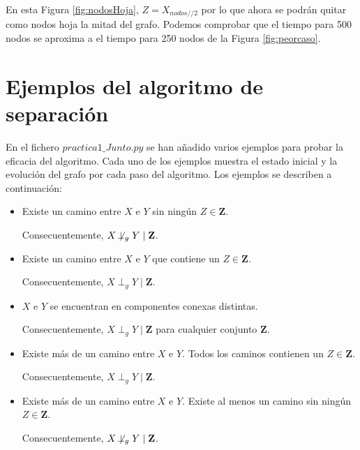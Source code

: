 \documentclass[a4paper,12pt]{article}
\newcommand{\notperpg}{\mathrel{\not\!\perp_g}}
\begin{document}
En esta Figura \ref{fig:nodosHoja}, $Z = X_{nodos//2}$ por lo que ahora se podrán quitar como nodos hoja la mitad del grafo. Podemos comprobar que el tiempo para 500 nodos se aproxima a el tiempo para 250 nodos de la Figura \ref{fig:peorcaso}. 

\section{Ejemplos del algoritmo de separación}
En el fichero $practica1\_Junto.py$ se han añadido varios ejemplos para probar la eficacia del algoritmo. Cada uno de los ejemplos muestra el estado inicial y la evolución del grafo por cada paso del algoritmo. Los ejemplos se describen a continuación:

\begin{itemize}
    \item Existe un camino entre $X$ e $Y$ sin ningún $Z \in \textbf{Z}$. 
    
    Consecuentemente, $X \notperpg Y \mid \textbf{Z}$.
    
    \item Existe un camino entre $X$ e $Y$ que contiene un $Z \in \textbf{Z}$.

    Consecuentemente, $X \perp _g Y \mid \textbf{Z}$.
    
    \item $X$ e $Y$ se encuentran en componentes conexas distintas.

    Consecuentemente, $X \perp _g Y \mid \textbf{Z}$ para cualquier conjunto $\textbf{Z}$.

    \item Existe más de un camino entre $X$ e $Y$. Todos los caminos contienen un $Z \in \textbf{Z}$.

    Consecuentemente, $X \perp _g Y \mid \textbf{Z}$.

    \item Existe más de un camino entre $X$ e $Y$. Existe al menos
    un camino sin ningún $Z \in \textbf{Z}$.

    Consecuentemente, $X \notperpg Y \mid \textbf{Z}$.
    
\end{itemize}
\end{document}

